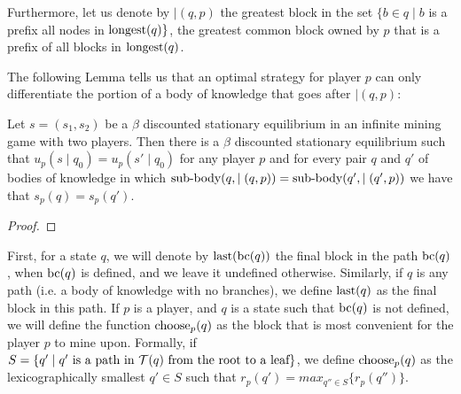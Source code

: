 Furthermore, let us denote by $\mid(q,p)$ the greatest block in the set $\{b \in q \mid b$ is a prefix all nodes in ${\text{\rm longest}}(q)\}$, the greatest common block owned by $p$ that is a prefix of all 
blocks in ${\text{\rm longest}}(q)$. 

The following Lemma tells us that an optimal strategy for player $p$ can only differentiate the portion of 
a body of knowledge that goes after $\mid(q,p)$: 

\begin{mylem}
Let $s = (s_1,s_2)$ be a $\beta$ discounted stationary equilibrium in an infinite mining game with two players. 
Then there is a $\beta$ discounted stationary equilibrium such that $u_p(s \mid q_0) = u_p(s' \mid q_0)$ for 
any player $p$ and for every pair $q$ and $q'$ of 
bodies of knowledge in which ${\text{\rm sub-body}}(q,\mid(q,p)) = {\text{\rm sub-body}}(q',\mid(q',p))$ we have that 
$s_p(q) = s_p(q')$. 
\end{mylem}

\begin{proof}
\end{proof}


\bigskip



First, for a state $q$, we will denote by $\text{\rm last}(\text{bc}(q))$ the final block in the path $\text{bc}(q)$, when $\text{bc}(q)$ is defined, and we leave it undefined otherwise. Similarly, if $q$ is any path (i.e. a body of knowledge with no branches), we define $\text{\rm last}(q)$ as the final block in this path. If $p$ is a player, and $q$ is a state such that $\text{bc}(q)$ is not defined, we will define the function $\text{\rm choose}_p(q)$ as the block that is most convenient for the player $p$ to mine upon. Formally, if $S=\{ q'\mid q' \text{ is a path in } \mathcal{T}(q) \text{ from the root to a leaf}\}$, we define $\text{\rm choose}_p(q)$ as the lexicographically smallest $q'\in S$ such that $r_p(q')=max_{q''\in S} \{r_p(q'')\}$.

%
%
%
%
%
%



